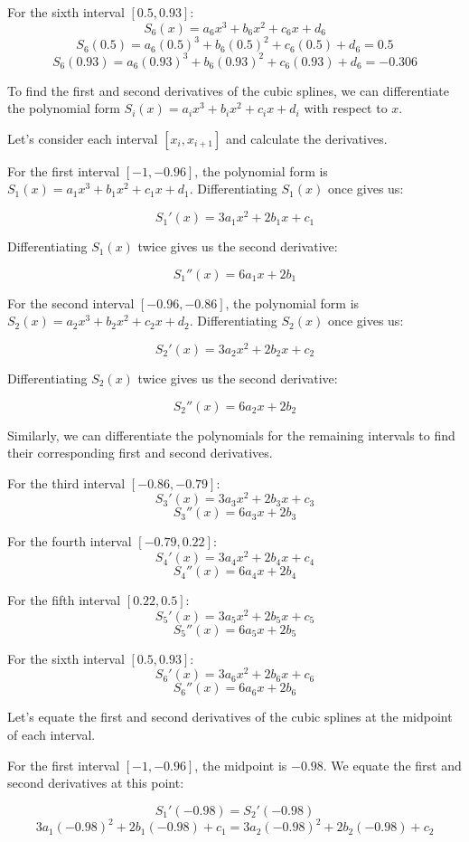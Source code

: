 \documentclass[12pt, a4paper]{article}
\numberwithin{equation}{section}
\begin{document}
For the sixth interval \([0.5, 0.93]\):
\[S_6(x) = a_6x^3 + b_6x^2 + c_6x + d_6\]
\[S_6(0.5) = a_6(0.5)^3 + b_6(0.5)^2 + c_6(0.5) + d_6 = 0.5\]
\[S_6(0.93) = a_6(0.93)^3 + b_6(0.93)^2 + c_6(0.93) + d_6 = -0.306\]

To find the first and second derivatives of the cubic splines, we can differentiate the polynomial form \(S_i(x) = a_ix^3 + b_ix^2 + c_ix + d_i\) with respect to \(x\).

Let's consider each interval \([x_i, x_{i+1}]\) and calculate the derivatives.

For the first interval \([-1, -0.96]\), the polynomial form is \(S_1(x) = a_1x^3 + b_1x^2 + c_1x + d_1\). Differentiating \(S_1(x)\) once gives us:

\[S_1'(x) = 3a_1x^2 + 2b_1x + c_1\]

Differentiating \(S_1(x)\) twice gives us the second derivative:

\[S_1''(x) = 6a_1x + 2b_1\]

For the second interval \([-0.96, -0.86]\), the polynomial form is \(S_2(x) = a_2x^3 + b_2x^2 + c_2x + d_2\). Differentiating \(S_2(x)\) once gives us:

\[S_2'(x) = 3a_2x^2 + 2b_2x + c_2\]

Differentiating \(S_2(x)\) twice gives us the second derivative:

\[S_2''(x) = 6a_2x + 2b_2\]

Similarly, we can differentiate the polynomials for the remaining intervals to find their corresponding first and second derivatives.

For the third interval \([-0.86, -0.79]\):
\[S_3'(x) = 3a_3x^2 + 2b_3x + c_3\]
\[S_3''(x) = 6a_3x + 2b_3\]

For the fourth interval \([-0.79, 0.22]\):
\[S_4'(x) = 3a_4x^2 + 2b_4x + c_4\]
\[S_4''(x) = 6a_4x + 2b_4\]

For the fifth interval \([0.22, 0.5]\):
\[S_5'(x) = 3a_5x^2 + 2b_5x + c_5\]
\[S_5''(x) = 6a_5x + 2b_5\]

For the sixth interval \([0.5, 0.93]\):
\[S_6'(x) = 3a_6x^2 + 2b_6x + c_6\]
\[S_6''(x) = 6a_6x + 2b_6\]

Let's equate the first and second derivatives of the cubic splines at the midpoint of each interval.

For the first interval \([-1, -0.96]\), the midpoint is \(-0.98\). We equate the first and second derivatives at this point:

\[S_1'(-0.98) = S_2'(-0.98)\]
\[3a_1(-0.98)^2 + 2b_1(-0.98) + c_1 = 3a_2(-0.98)^2 + 2b_2(-0.98) + c_2\]
\end{document}
